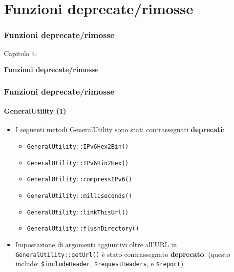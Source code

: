%

\section{Funzioni deprecate/rimosse}
\begin{frame}[fragile]
	\frametitle{Funzioni deprecate/rimosse}

	\begin{center}\huge{Capitolo 4:}\end{center}
	\begin{center}\huge{\color{typo3darkgrey}\textbf{Funzioni deprecate/rimosse}}\end{center}

\end{frame}


\begin{frame}[fragile]
	\frametitle{Funzioni deprecate/rimosse}
	\framesubtitle{GeneralUtility (1)}

	\begin{itemize}
		\item I seguenti metodi GeneralUtility sono stati contrassegnati \textbf{deprecati}:
			\begin{itemize}\smaller
				\item \texttt{GeneralUtility::IPv6Hex2Bin()}
				\item \texttt{GeneralUtility::IPv6Bin2Hex()}
				\item \texttt{GeneralUtility::compressIPv6()}
				\item \texttt{GeneralUtility::milliseconds()}
				\item \texttt{GeneralUtility::linkThisUrl()}
				\item \texttt{GeneralUtility::flushDirectory()}
			\end{itemize}\normalsize
			\vspace{0.4cm}

		\item Impostazione di argomenti aggiuntivi oltre all'URL in \texttt{GeneralUtility::getUrl()}
			è stato contrassegnato \textbf{deprecato}.\newline
			\smaller
				(questo include: \texttt{\$includeHeader}, \texttt{\$requestHeaders}, e \texttt{\$report})
			\normalsize

	\end{itemize}

\end{frame}

